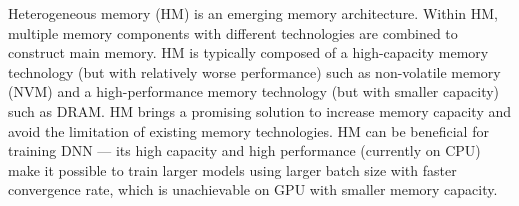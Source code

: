 
Heterogeneous memory (HM) is an emerging memory architecture.  %
Within HM, multiple memory components with different technologies are combined to construct main memory. HM is typically composed of a high-capacity memory technology (but with relatively worse performance) such as non-volatile memory (NVM) and a high-performance memory technology (but with smaller capacity) such as DRAM. HM brings a promising solution to increase memory capacity and avoid the limitation of existing memory technologies. %
HM can be beneficial for training DNN --- 
its high capacity and high performance (currently on CPU) make it possible to train larger models using larger batch size with faster convergence rate, which is unachievable on GPU with smaller memory capacity.




